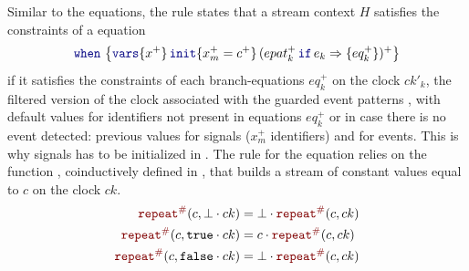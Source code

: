 Similar to the  equations, the rule  states
that a stream context $H$ satisfies the constraints of a  equation
\begin{equation*}
    \when{x^+}{x_m^+ = c^+}{(\branch{epat_k^+}{e_k}{eq_k^+})^+}
\end{equation*}
if it satisfies the constraints of each
branch-equations $eq_k^+$ on the clock $ck'_k$, the filtered version of the clock associated with the
guarded event patterns , with default values for identifiers not present in equations $eq_k^+$ or in case there is no
event detected: previous values for signals ($x_m^+$ identifiers) and \none for events.
This is why signals has to be initialized in .
%
The rule for the  equation relies on the function , coinductively defined in
, that builds
a stream of constant values equal to $c$ on the clock $ck$.
\begin{align}
    \const{c}{\bot \step ck}   & = \bot \step \const{c}{ck} \label{eq:semantics:grsync:denot:aux:const1} \\
    \const{c}{\true \step ck}  & = c \step \const{c}{ck}                                                 \\
    \const{c}{\false \step ck} & = \bot \step \const{c}{ck} \label{eq:semantics:grsync:denot:aux:const3}
\end{align}

